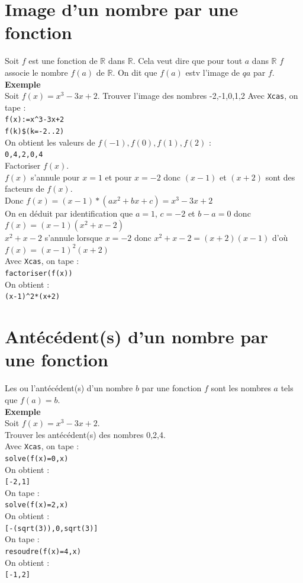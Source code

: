\documentclass[a4paper,11pt]{book}
\newcommand{\R}{{\mathbb{R}}}
\begin{document}
\section{Image d'un nombre par une fonction}\index{\$}
Soit $f$ est une fonction de $\R$ dans $\R$. Cela veut dire que pour tout 
$a$ dans $\R$ $f$ associe le nombre $f(a)$ de $\R$. On dit que  $f(a)$ estv l'image de $qa$ par $f$.\\
{\bf Exemple}\\
Soit $f(x)=x^3-3x+2$.
Trouver l'image des nombres -2,-1,0,1,2
Avec {\tt Xcas}, on tape :\\
{\tt f(x):=x\verb|^|3-3x+2}\\
{\tt f(k)\$(k=-2..2)}\\
On obtient les valeurs de $f(-1),f(0),f(1),f(2)$ :\\
{\tt 0,4,2,0,4}\\
Factoriser $f(x)$.\\
$f(x)$ s'annule pour $x=1$ et pour $x=-2$ donc $(x-1)$ et $(x+2)$ sont des 
facteurs de $f(x)$.\\
Donc $f(x)=(x-1)*(ax^2+bx+c)=x^3-3x+2$\\
On en d\'eduit par identification que $a=1$, $c=-2$ et $b-a=0$ donc  
$f(x)=(x-1)(x^2+x-2)$\\
$x^2+x-2$ s'annule lorsque $x=-2$ donc $x^2+x-2=(x+2)(x-1)$ d'o\`u 
$f(x)=(x-1)^2(x+2)$\\
Avec {\tt Xcas}, on tape :\\
{\tt factoriser(f(x))}\\
On obtient :\\
{\tt (x-1)\verb|^|2*(x+2)}

\section{Ant\'ec\'edent(s) d'un nombre par une fonction}
Les ou l'ant\'ec\'edent(s) d'un nombre $b$ par une fonction $f$ sont les 
nombres $a$ tels que $f(a)=b$.\\
{\bf Exemple}\\
Soit $f(x)=x^3-3x+2$.\\
Trouver les ant\'ec\'edent(s) des nombres 0,2,4.\\
Avec {\tt Xcas}, on tape :\\
{\tt solve(f(x)=0,x)}\\
On obtient :\\
{\tt [-2,1]}\\
On tape :\\
{\tt solve(f(x)=2,x)}\\
On obtient :\\
{\tt [-(sqrt(3)),0,sqrt(3)]}\\
On tape :\\
{\tt resoudre(f(x)=4,x)}\\
On obtient :\\
{\tt [-1,2]}
\end{document}
